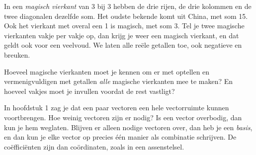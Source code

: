 %


\begin{probleem}
In een \textit{magisch vierkant} van 3 bij 3 hebben de drie rijen, de drie kolommen en de twee diagonalen dezelfde som. Het oudste bekende komt uit China, met som 15. Ook het vierkant met overal een 1 is magisch, met som 3. Tel je twee magische vierkanten vakje per vakje op, dan krijg je weer een magisch vierkant, en dat geldt ook voor een veelvoud. We laten alle reële getallen toe, ook negatieve en breuken.


\noindent Hoeveel magische vierkanten moet je kennen om er met optellen en vermenigvuldigen met getallen \textit{alle} magische vierkanten mee te maken? En hoeveel vakjes moet je invullen voordat de rest vastligt?
\end{probleem}


In hoofdstuk 1 zag je dat een paar vectoren een hele vectorruimte kunnen voortbrengen. Hoe weinig vectoren zijn er nodig? Is een vector overbodig, dan kun je hem weglaten. Blijven er alleen nodige vectoren over, dan heb je een \textit{basis}, en dan kun je elke vector op precies één manier als combinatie schrijven. De coëfficiënten zijn dan coördinaten, zoals in een assenstelsel.


